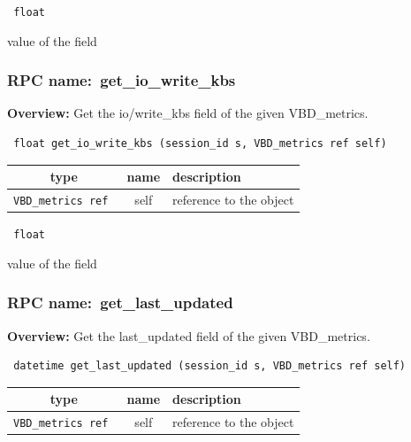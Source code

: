\vspace{0.3cm}

{\tt 
float
}


value of the field
\vspace{0.3cm}
\vspace{0.3cm}
\vspace{0.3cm}
\subsubsection{RPC name:~get\_io\_write\_kbs}

{\bf Overview:} 
Get the io/write\_kbs field of the given VBD\_metrics.

\begin{verbatim} float get_io_write_kbs (session_id s, VBD_metrics ref self)\end{verbatim}



 
\vspace{0.3cm}
\begin{tabular}{|c|c|p{7cm}|}
 \hline
{\bf type} & {\bf name} & {\bf description} \\ \hline
{\tt VBD\_metrics ref } & self & reference to the object \\ \hline 

\end{tabular}

\vspace{0.3cm}

{\tt 
float
}


value of the field
\vspace{0.3cm}
\vspace{0.3cm}
\vspace{0.3cm}
\subsubsection{RPC name:~get\_last\_updated}

{\bf Overview:} 
Get the last\_updated field of the given VBD\_metrics.

\begin{verbatim} datetime get_last_updated (session_id s, VBD_metrics ref self)\end{verbatim}



 
\vspace{0.3cm}
\begin{tabular}{|c|c|p{7cm}|}
 \hline
{\bf type} & {\bf name} & {\bf description} \\ \hline
{\tt VBD\_metrics ref } & self & reference to the object \\ \hline 

\end{tabular}

